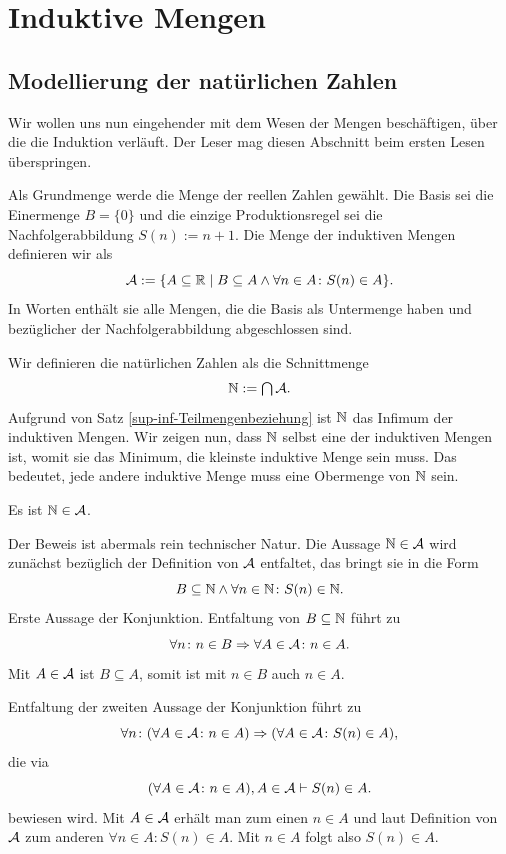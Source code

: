 \section{Induktive Mengen}

\subsection{Modellierung der natürlichen Zahlen}

Wir wollen uns nun eingehender mit dem Wesen der Mengen beschäftigen,
über die die Induktion verläuft. Der Leser mag diesen Abschnitt
beim ersten Lesen überspringen.

Als Grundmenge werde die Menge der reellen Zahlen gewählt. Die Basis sei
die Einermenge $B=\{0\}$ und die einzige Produktionsregel sei die
Nachfolgerabbildung $S(n):=n+1$. Die Menge der induktiven Mengen definieren
wir als
\[\mathcal{A} := \{A\subseteq\mathbb R\mid
B\subseteq A\land\forall n\in A\colon S(n)\in A\}.\]
In Worten enthält sie alle Mengen, die die Basis als Untermenge
haben und bezüglicher der Nachfolgerabbildung abgeschlossen sind.

Wir definieren die natürlichen Zahlen
 als die Schnittmenge
\[\textstyle\mathbb N := \bigcap\mathcal{A}.\]
Aufgrund von Satz \ref{sup-inf-Teilmengenbeziehung} ist $\mathbb N$ das Infimum
der induktiven Mengen. Wir zeigen nun, dass $\mathbb N$ selbst eine der
induktiven Mengen ist, womit sie das Minimum, die kleinste
induktive Menge sein muss. Das bedeutet, jede andere induktive Menge
muss eine Obermenge von $\mathbb N$ sein.

\begin{Satz}\label{N-is-inductive}
Es ist $\mathbb N\in\mathcal{A}$.
\end{Satz}
\begin{Beweis}
Der Beweis ist abermals rein technischer Natur. Die Aussage
$\mathbb N\in\mathcal{A}$ wird zunächst bezüglich der Definition von
$\mathcal{A}$ entfaltet, das bringt sie in die Form
\[\textstyle B\subseteq\mathbb N\land\forall n\in\mathbb N\colon S(n)\in\mathbb N.\]
Erste Aussage der Konjunktion. Entfaltung von $B\subseteq\mathbb N$ führt zu
\[\forall n\colon n\in B\Rightarrow \forall A\in\mathcal{A}\colon n\in A.\]
Mit $A\in\mathcal{A}$ ist $B\subseteq A$, somit ist mit $n\in B$ auch
$n\in A$.

Entfaltung der zweiten Aussage der Konjunktion führt zu
\[\forall n\colon (\forall A\in\mathcal{A}\colon n\in A)\Rightarrow
(\forall A\in\mathcal{A}\colon S(n)\in A),\]
die via
\[(\forall A\in\mathcal{A}\colon n\in A), A\in\mathcal{A}\vdash S(n)\in A.\]
bewiesen wird. Mit $A\in\mathcal{A}$ erhält man zum einen $n\in A$ und
laut Definition von $\mathcal{A}$ zum anderen $\forall n\in A\colon S(n)\in A$.
Mit $n\in A$ folgt also $S(n)\in A$.\,\qedsymbol
\end{Beweis}

